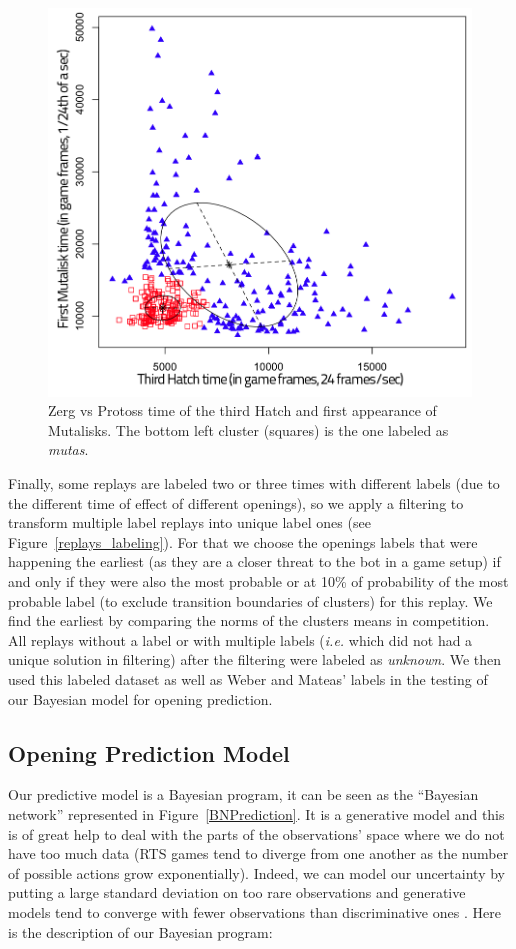 \begin{figure}[htp]
\centerline{\includegraphics[width=0.7\columnwidth]{images/ZvPmutas.png}}
\caption{Zerg vs Protoss time of the third Hatch and first appearance of Mutalisks. The bottom left cluster (squares) is the one labeled as \textit{mutas}.}
\label{ZvPmutas}
\end{figure}

Finally, some replays are labeled two or three times with different labels (due to the different time of effect of different openings), so we apply a filtering to transform multiple label replays into unique label ones (see Figure~\ref{replays_labeling}). For that we choose the openings labels that were happening the earliest (as they are a closer threat to the bot in a game setup) if and only if they were also the most probable or at 10\% of probability of the most probable label (to exclude transition boundaries of clusters) for this replay. We find the earliest by comparing the norms of the clusters means in competition. All replays without a label or with multiple labels (\textit{i.e.} which did not had a unique solution in filtering) after the filtering were labeled as \textit{unknown}. We then used this labeled dataset as well as Weber and Mateas' labels in the testing of our Bayesian model for opening prediction.

\subsection{Opening Prediction Model}

Our predictive model is a Bayesian program, it can be seen as the ``Bayesian network'' represented in Figure~\ref{BNPrediction}. It is a generative model and this is of great help to deal with the parts of the observations' space where we do not have too much data (RTS games tend to diverge from one another as the number of possible actions grow exponentially). Indeed, we can model our uncertainty by putting a large standard deviation on too rare observations and generative models tend to converge with fewer observations than discriminative ones \citep{Jordan}. Here is the description of our Bayesian program:

